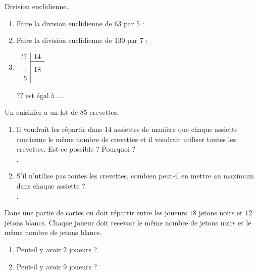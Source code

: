 \documentclass[a4paper]{article}
\begin{document}
\begin{question}[(3 points)] Division euclidienne.
	\begin{enumerate}
		\item Faire la division euclidienne de 63 par 5 : \\[2cm]
		\item Faire la division euclidienne de 130 par 7 : \\[2cm]
		\item \renewcommand{\arraystretch}{1.3}
		      $
			      \begin{array}{r|r}
				      ??     & 14 \\
				      \cline{2-2}
				      \vdots & 18 \\
				      5      &
			      \end{array}
		      $ \renewcommand{\arraystretch}{1}

		      $??$ est égal à ....
	\end{enumerate}
\end{question}

\begin{question}[(2.5 points)]

	Un cuisinier a un lot de 85 crevettes.
	\begin{enumerate}
		\item Il voudrait les répartir dans 14 assiettes de manière que chaque assiette contienne le même nombre de crevettes et il voudrait utiliser toutes les crevettes. Est-ce possible ? Pourquoi ? \\[0.3cm]
		      .\dotfill
		\item S’il n’utilise pas toutes les crevettes, combien peut-il en mettre au maximum dans chaque assiette ? \\[0.3cm]
		      .\dotfill
	\end{enumerate}
\end{question}

\begin{question}[(2 points)]
	Dans une partie de cartes on doit répartir entre les joueurs $18$ jetons noirs et $12$ jetons blancs. Chaque joueur doit recevoir le même nombre de jetons noirs et le même nombre de jetons blancs.
	\begin{enumerate}
		\item Peut-il y avoir $2$ joueurs ?
		\item Peut-il y avoir $9$ joueurs ?
	\end{enumerate}
\end{question}
\end{document}

